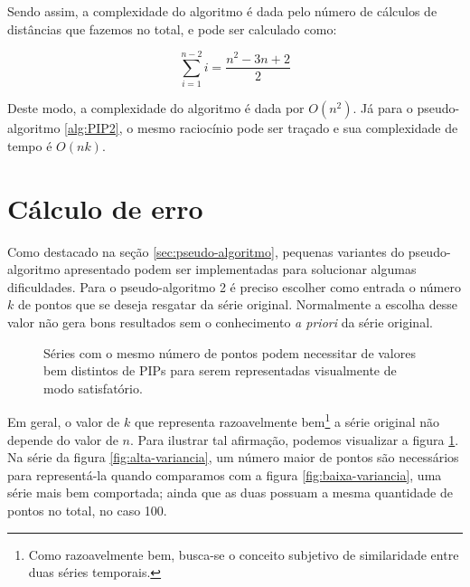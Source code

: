 Sendo assim, a complexidade do algoritmo é dada pelo número de cálculos de distâncias que fazemos no total, e pode ser calculado como:

\[
 \sum_{i=1}^{n - 2} i = \frac{n^2 - 3n + 2}{2}
\]

Deste modo, a complexidade do algoritmo é dada por $O(n^2)$. Já para o pseudo-algoritmo \ref{alg:PIP2}, o mesmo raciocínio pode ser traçado e sua complexidade de tempo é $O(nk)$.

\section{Cálculo de erro}
\label{sec:calculo-erro}
Como destacado na seção \ref{sec:pseudo-algoritmo}, pequenas variantes do pseudo-algoritmo apresentado podem ser implementadas para solucionar algumas dificuldades. Para o pseudo-algoritmo 2 é preciso escolher como entrada o número $k$ de pontos que se deseja resgatar da série original. Normalmente a escolha desse valor não gera bons resultados sem o conhecimento \textit{a priori} da série original.


\begin{figure}[htb!]
  \begin{center}
    \centering
    \caption[Variância influencia número de PIPs]{Séries com o mesmo número de pontos podem necessitar de valores bem distintos de PIPs para serem representadas visualmente de modo satisfatório.}
    \label{fig:k-n}
  \end{center}
\end{figure}

Em geral, o valor de $k$ que representa razoavelmente bem\footnote{Como razoavelmente bem, busca-se o conceito subjetivo de similaridade entre duas séries temporais.} a série original não depende do valor de $n$. Para ilustrar tal afirmação, podemos visualizar a figura \ref{fig:k-n}. Na série da figura \ref{fig:alta-variancia}, um número maior de pontos são necessários para representá-la quando comparamos com a figura \ref{fig:baixa-variancia}, uma série mais bem comportada; ainda que as duas possuam a mesma quantidade de pontos no total, no caso 100.

